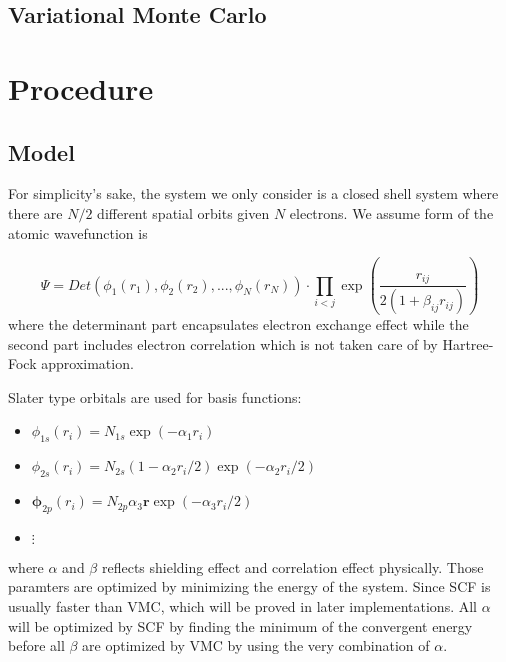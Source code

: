 \documentclass[11pt]{article}
\begin{document}
\subsection{Variational Monte Carlo}


\section{Procedure}
\subsection{Model}

For simplicity's sake, the system we only consider is a closed shell system where there are $N/2$ different spatial orbits given $N$ electrons. We assume form of the atomic wavefunction is 

\begin{equation}
\label{eq:atomic-wavefunction}
    \Psi = Det(\phi_1(r_1), \phi_2(r_2), ..., \phi_N(r_N)) \cdot \prod_{i<j}\exp(\frac{r_{ij}}{2(1 + \beta_{ij}r_{ij})})
\end{equation}
where the determinant part encapsulates electron exchange effect while the second part includes electron correlation which is not taken care of by Hartree-Fock approximation. 

Slater type orbitals are used for basis functions: \cite{hjorthcomputational}
\begin{itemize}
    \item $\phi_{1s}(r_i) = N_{1s}\exp(-\alpha_1 r_i)$
    \item $\phi_{2s}(r_i) = N_{2s}(1 - \alpha_2 r_i / 2)\exp(-\alpha_2 r_i / 2)$
    \item $\mathbf{\phi}_{2p}(r_i) = N_{2p} \alpha_3 \textbf{r} \exp(-\alpha_3 r_i/2)$
    \item $\vdots$
\end{itemize}
where $\alpha$ and $\beta$ reflects shielding effect and correlation effect physically. Those paramters are optimized by minimizing the energy of the system. Since SCF is usually faster than VMC, which will be proved in later implementations. All $\alpha$ will be optimized by SCF by finding the minimum of the convergent energy before all $\beta$ are optimized by VMC by using the very combination of $\alpha$.
\end{document}
